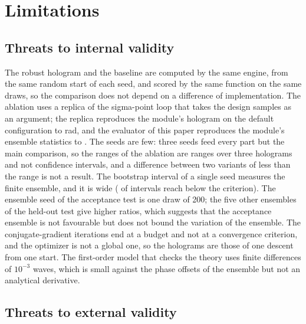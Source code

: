 \section{Limitations}\label{sec:limits}

\subsection{Threats to internal validity}

The robust hologram and the baseline are computed by the same engine, from the same random start of each seed, and scored by the same function on the same draws, so the comparison does not depend on a difference of implementation. The ablation uses a replica of the sigma-point loop that takes the design samples as an argument; the replica reproduces the module's hologram on the default configuration to \replicaDiff{} rad, and the evaluator of this paper reproduces the module's ensemble statistics to \evalCheckMax. The seeds are few: three seeds feed every part but the main comparison, so
the ranges of the ablation are ranges over three holograms and not confidence intervals, and a difference between two variants of less than the range is not a result. The bootstrap interval of a single seed measures the finite ensemble, and it is wide (\ciBelowN{} of \nSeedsAll{} intervals reach below the criterion). The ensemble seed of the acceptance test is one draw of 200; the five other ensembles of the held-out test give higher ratios, which suggests that the acceptance ensemble is not favourable but does not bound the variation of
the ensemble. The conjugate-gradient iterations end at a budget and not at a convergence criterion, and the optimizer is not a global one, so the holograms are those of one descent from one start. The first-order model that checks the theory uses finite differences of $10^{-3}$ waves, which is small against the phase offsets of the ensemble but not an analytical derivative.

\subsection{Threats to external validity}

